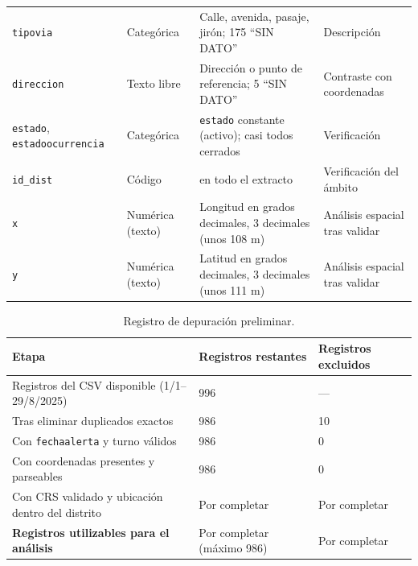 \begin{longtable}{@{}p{4.0cm}>{\raggedright\arraybackslash}p{1.9cm}>{\raggedright\arraybackslash}p{5.3cm}>{\raggedright\arraybackslash}p{3.0cm}@{}}
\texttt{tipovia} & Categórica & Calle, avenida, pasaje, jirón; 175 ``SIN DATO'' & Descripción \\
\texttt{direccion} & Texto libre & Dirección o punto de referencia; 5 ``SIN DATO'' & Contraste con coordenadas \\
\texttt{estado}, \texttt{estadoocurrencia} & Categórica & \texttt{estado} constante (activo); casi todos cerrados & Verificación \\
\texttt{id\_dist} & Código & 080105 en todo el extracto & Verificación del ámbito \\
\texttt{x} & Numérica (texto) & Longitud en grados decimales, 3 decimales (unos 108 m) & Análisis espacial tras validar \\
\texttt{y} & Numérica (texto) & Latitud en grados decimales, 3 decimales (unos 111 m) & Análisis espacial tras validar \\
\end{longtable}
\endgroup
{}

\label{anx:depuracion}

\begin{table}[H]
\centering
\caption{Registro de depuración preliminar.}
\label{tab:depuracion}
\begingroup\singlespacing\footnotesize
\begin{tabular}{@{}p{7.0cm}p{3.0cm}p{3.0cm}@{}}
\toprule
\textbf{Etapa} & \textbf{Registros restantes} & \textbf{Registros excluidos} \\
\midrule
Registros del CSV disponible (1/1--29/8/2025) & 996 & --- \\
Tras eliminar duplicados exactos & 986 & 10 \\
Con \texttt{fechaalerta} y turno válidos & 986 & 0 \\
Con coordenadas presentes y parseables & 986 & 0 \\
Con CRS validado y ubicación dentro del distrito & Por completar & Por completar \\
\textbf{Registros utilizables para el análisis} & Por completar (máximo 986) & Por completar \\
\bottomrule
\end{tabular}
\endgroup
{}
\end{table}

